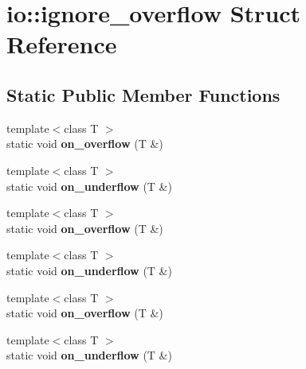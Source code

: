 \hypertarget{structio_1_1ignore__overflow}{}\section{io\+:\+:ignore\+\_\+overflow Struct Reference}
\label{structio_1_1ignore__overflow}
\subsection*{Static Public Member Functions}
\begin{DoxyCompactItemize}
\item 
\mbox{\label{structio_1_1ignore__overflow_aed3e5026cfa7157ea9270ae377d1026b}} 
{\footnotesize template$<$class T $>$ }\\static void {\bfseries on\+\_\+overflow} (T \&)
\item 
\mbox{\label{structio_1_1ignore__overflow_aece692f7a20933149ec99aa1f97458ad}} 
{\footnotesize template$<$class T $>$ }\\static void {\bfseries on\+\_\+underflow} (T \&)
\item 
\mbox{\label{structio_1_1ignore__overflow_aed3e5026cfa7157ea9270ae377d1026b}} 
{\footnotesize template$<$class T $>$ }\\static void {\bfseries on\+\_\+overflow} (T \&)
\item 
\mbox{\label{structio_1_1ignore__overflow_aece692f7a20933149ec99aa1f97458ad}} 
{\footnotesize template$<$class T $>$ }\\static void {\bfseries on\+\_\+underflow} (T \&)
\item 
\mbox{\label{structio_1_1ignore__overflow_aed3e5026cfa7157ea9270ae377d1026b}} 
{\footnotesize template$<$class T $>$ }\\static void {\bfseries on\+\_\+overflow} (T \&)
\item 
\mbox{\label{structio_1_1ignore__overflow_aece692f7a20933149ec99aa1f97458ad}} 
{\footnotesize template$<$class T $>$ }\\static void {\bfseries on\+\_\+underflow} (T \&)
\end{DoxyCompactItemize}


